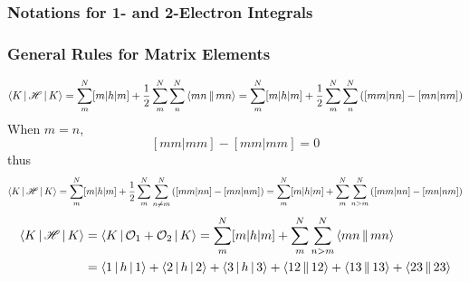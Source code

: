 \documentclass[a4paper]{article}
\begin{document}
\subsubsection{Notations for 1- and 2-Electron Integrals}
\subsubsection{General Rules for Matrix Elements}
\begin{equation}\label{key}
\Braket{K | \mathscr{H} | K} = \sum_m^N [m|h|m] + \dfrac{1}{2}\sum_m^N\sum_n^N \Braket{mn||mn} = \sum_m^N [m|h|m] + \dfrac{1}{2}\sum_m^N\sum_n^N \qty([mm|nn] - [mn|nm])
\end{equation}
When $ m=n $,
\begin{equation}\label{key}
[mm|mm] - [mm|mm] = 0
\end{equation}
thus
\begin{equation}\label{key}
\Braket{K | \mathscr{H} | K} = \sum_m^N [m|h|m] + \dfrac{1}{2}\sum_m^N\sum_{n\neq m}^N \qty([mm|nn] - [mn|nm]) = \sum_m^N [m|h|m] + \sum_m^N\sum_{n> m}^N \qty([mm|nn] - [mn|nm])
\end{equation}
\begin{equation}\label{key}
\begin{aligned}
\Braket{K | \mathscr{H} | K} &= \Braket{K | \mathcal{O}_1 + \mathcal{O}_2 | K} = \sum_m^N [m|h|m] + \sum_m^N\sum_{n>m}^N \Braket{mn||mn}\\
&= \Braket{1|h|1} + \Braket{2|h|2} + \Braket{3|h|3} + \Braket{12||12} + \Braket{13||13} + \Braket{23||23} 
\end{aligned}
\end{equation}
\end{document}
